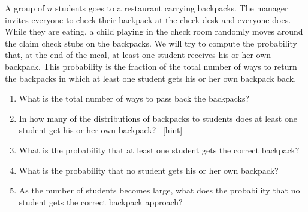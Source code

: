 \documentclass{book}
\begin{document}
\setcounter{project}{222}
\addtocounter{project}{-1}
\begin{activity}[]\label{hatcheck}
\hypertarget{p-1224}{}%
A group of \(n\) students goes to a restaurant carrying backpacks. The manager invites everyone to check their backpack at the check desk and everyone does. While they are eating, a child playing in the check room randomly moves around the claim check stubs on the backpacks. We will try to compute the probability that, at the end of the meal, at least one student receives his or her own backpack.  This probability is the fraction of the total number of ways to return the backpacks in which at least one student gets his or her own backpack back.%
\begin{enumerate}[font=\bfseries,label=(\alph*),ref=\alph*]
\item\label{task-228} \hypertarget{p-1225}{}%
What is the total number of ways to pass back the backpacks?%
\item\label{task-229} \hypertarget{p-1227}{}%
In how many of the distributions of backpacks to students does at least one student get his or her own backpack?%
~\hfill{\tiny\hyperlink{a-222.b}{[hint]}\hypertarget{q-222.b}{}}\item\label{task-230} \hypertarget{p-1231}{}%
What is the probability that at least one student gets the correct backpack?%
\item\label{hatcheckprobpart} \hypertarget{p-1233}{}%
What is the probability that no student gets his or her own backpack?%
\item\label{task-232} \hypertarget{p-1235}{}%
As the number of students becomes large, what does the probability that no student gets the correct backpack approach?%
\end{enumerate}
\end{activity}
\end{document}
